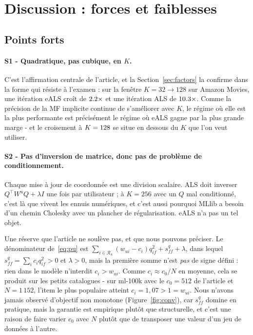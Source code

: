 
\section{Discussion : forces et faiblesses}\label{sec:discussion}

\subsection{Points forts}

\paragraph{S1 - Quadratique, pas cubique, en $K$.} C'est l'affirmation centrale de
l'article, et la Section~\ref{sec:factors} la confirme dans la forme qui résiste à
l'examen : sur la fenêtre $K=32\rightarrow128$ sur Amazon Movies, une itération eALS
croît de $2.2\times$ et une itération ALS de $10.3\times$. Comme
la précision de la MF implicite continue de s'améliorer avec $K$, le régime où elle est
la plus performante est précisément le régime où eALS gagne par la plus grande marge
- et le croisement à $K=128$ se situe en dessous du $K$ que l'on veut utiliser.

\paragraph{S2 - Pas d'inversion de matrice, donc pas de problème de
conditionnement.} Chaque mise à jour de coordonnée est une division scalaire. ALS
doit inverser $Q^{\top}W^uQ+\lambda I$ une fois par utilisateur ; à $K=256$ avec un
$Q$ mal conditionné, c'est là que vivent les ennuis numériques, et c'est aussi
pourquoi MLlib a besoin d'un chemin Cholesky avec un plancher de régularisation. eALS
n'a pas un tel objet.

Une réserve que l'article ne soulève pas, et que nous pouvons préciser. Le
dénominateur de~\eqref{eq:pu} est
$\sum_{i\in\mathcal{R}_u}(w_{ui}-c_i)q_{if}^2+s^q_{ff}+\lambda$, dans lequel
$s^q_{ff}=\sum_i c_iq_{if}^2>0$ et $\lambda>0$, mais la première somme n'est
\emph{pas} de signe défini : rien dans le modèle n'interdit $c_i>w_{ui}$. Comme
$c_i \approx c_0/N$ en moyenne, cela se produit sur les petits catalogues - sur
ml-100k avec le $c_0=512$ de l'article et $N=1\,152$, l'item le plus populaire atteint
$c_i=1,07>1=w_{ui}$. Nous n'avons jamais observé d'objectif non monotone
(Figure~\ref{fig:conv}), car $s^q_{ff}$ domine en pratique, mais la garantie est
empirique plutôt que structurelle, et c'est une raison de faire varier $c_0$ avec $N$
plutôt que de transposer une valeur d'un jeu de données à l'autre.

